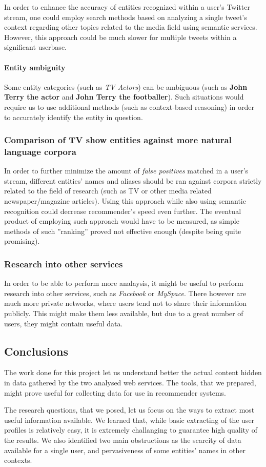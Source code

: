 In order to enhance the accuracy of entities recognized within a user's Twitter
stream, one could employ search methods based on analyzing a single tweet's
context regarding other topics related to the media field using semantic
services.  However, this approach could be much slower for multiple tweets
within a significant userbase.

\paragraph{Entity ambiguity}

Some entity categories (such as \textit{TV Actors}) can be ambiguous (such as \textbf{John Terry the actor} and \textbf{John Terry the footballer}). Such situations
would require us to use additional methods (such as context-based reasoning) in order to accurately identify the entity in question.

\subsubsection{Comparison of TV show entities against more natural language corpora}

In order to further minimize the amount of \textit{false positives} matched in a user's
stream, different entities' names and aliases should be ran against corpora
strictly related to the field of research (such as TV or other media related
newspaper/magazine articles). Using this approach while also using semantic
recognition could decrease recommender's speed even further. The eventual
product of employing such approach would have to be measured, as simple methods
of such ''ranking'' proved not effective enough (despite being quite
promising).

\subsubsection{Research into other services}

In order to be able to perform more analaysis, it might be useful to perform
research into other services, such as \textit{Facebook} or \textit{MySpace}.
There however are much more private networks, where users tend not to share
their information publicly. This might make them less available, but due to a
great number of users, they might contain useful data.

\subsection{Conclusions}

The work done for this project let us understand better the actual content
hidden in data gathered by the two analysed web services. The tools, that we
prepared, might prove useful for collecting data for use in recommender systems.

The research questions, that we posed, let us focus on the ways to extract most
useful information available. We learned that, while basic extracting of the
user profiles is relatively easy, it is extremely challanging to guarantee high
quality of the results. We also identified two main obstructions as the
scarcity of data available for a single user, and pervasiveness of some
entities' names in other contexts.
